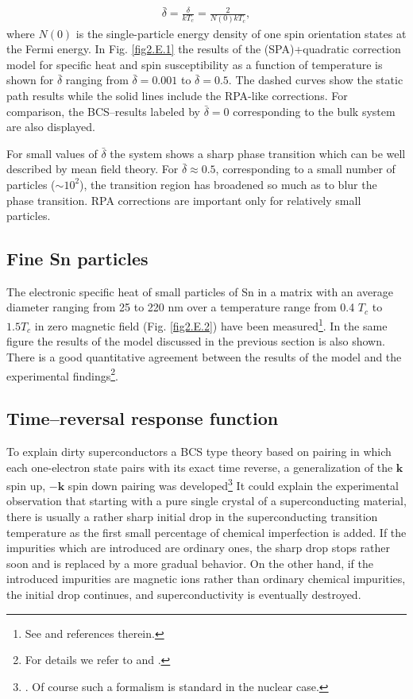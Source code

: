 \begin{align}
\bar{\delta}=\frac{\delta}{kT_c}=\frac{2}{N(0)kT_c},
\end{align}
where $N(0)$ is the single-particle energy density of one spin orientation states at the Fermi energy. In Fig. \ref{fig2.E.1} the results of the (SPA)+quadratic correction model for specific heat and spin susceptibility as a function of temperature is shown for $\bar{\delta}$ ranging from $\bar\delta=0.001$ to $\bar{\delta}=0.5$. The dashed curves show the static path results while the solid lines include the RPA-like corrections. For comparison, the BCS--results labeled by $\bar\delta=0$ corresponding to the bulk system are also displayed.


For small values of $\bar\delta$ the system shows a sharp phase transition which can be well described by mean field theory. For $\bar\delta\approx0.5$, corresponding to a small number of particles ($\sim10^2$), the transition region has broadened so much as to blur the phase transition. RPA corrections are important only for relatively small particles.
\subsection{Fine Sn particles}
The electronic specific heat of small particles of Sn in a matrix with an average diameter ranging from 25 to 220 nm over a temperature range from 0.4 $T_c$ to $1.5T_c$ in zero magnetic field (Fig. \ref{fig2.E.2}) have been measured\footnote{See \cite{Perenboom:81} and references therein.}. In the same figure the results of the model discussed in the previous section is also shown.
There is a good quantitative agreement between the results of the model and the experimental findings\footnote{For details we refer to \cite{Lauritzen:93} and \cite{Muhlschlegel:72}.}.
\subsection{Time--reversal response function}
To explain dirty superconductors a BCS type theory based on pairing in which each one-electron state pairs with its exact time reverse, a generalization of the $\mathbf k$ spin up, $-\mathbf k$ spin down pairing was developed\footnote{\cite{Anderson:59}. Of course such a formalism is standard in the nuclear case.} It could explain the experimental observation that starting with a pure single crystal of a superconducting material, there is usually a rather sharp initial drop in the superconducting transition temperature as the first small percentage of chemical imperfection is added. If the impurities which are introduced are ordinary ones, the sharp drop stops rather soon and is replaced by a more gradual behavior. On the other hand, if the introduced impurities are magnetic ions rather than ordinary chemical impurities, the initial drop continues, and superconductivity is eventually destroyed.


